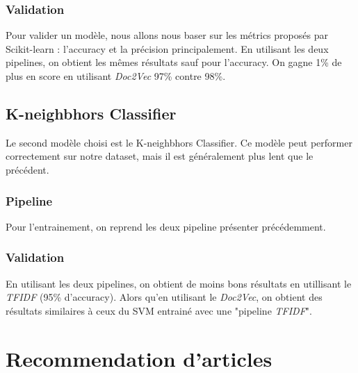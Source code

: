 \documentclass[a4paper,12pt]{article}
\begin{document}
\subsubsection{Validation}

Pour valider un modèle, nous allons nous baser sur les métrics proposés par Scikit-learn : l'accuracy et la précision principalement. En utilisant les deux pipelines, on obtient les mêmes résultats sauf pour l'accuracy. On gagne 1\% de plus en score en utilisant \textit{Doc2Vec} 97\% contre 98\%.

\subsection{K-neighbhors Classifier}

Le second modèle choisi est le K-neighbhors Classifier. Ce modèle peut performer correctement sur notre dataset, mais il est généralement plus lent que le précédent.\\

\subsubsection{Pipeline}

Pour l'entrainement, on reprend les deux pipeline présenter précédemment.

\subsubsection{Validation}

En utilisant les deux pipelines, on obtient de moins bons résultats en utillisant le \textit{TFIDF} (95\% d'accuracy). Alors qu'en utilisant le \textit{Doc2Vec}, on obtient des résultats similaires à ceux du SVM entrainé avec une "pipeline \textit{TFIDF}".

\section{Recommendation d'articles}
\end{document}

